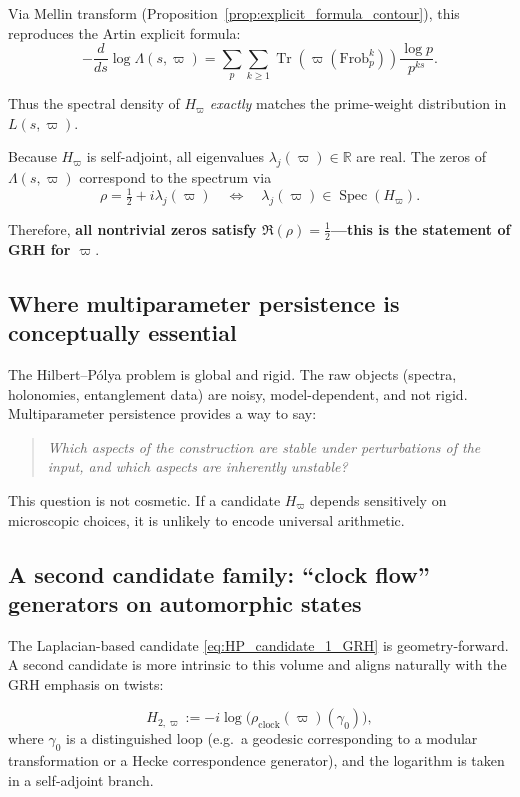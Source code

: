 \documentclass[11pt,oneside]{amsbook}
\numberwithin{equation}{section}
\theoremstyle{plain}
\theoremstyle{definition}
\theoremstyle{remark}
\DeclareMathOperator{\Spec}{\mathrm{Spec}}
\DeclareMathOperator{\Tr}{\mathrm{Tr}}
\begin{document}
Via Mellin transform (Proposition~\ref{prop:explicit_formula_contour}), this reproduces the Artin explicit formula:
\[-\frac{d}{ds}\log\Lambda(s,\varpi) = \sum_p \sum_{k \ge 1} \Tr(\varpi(\mathrm{Frob}_p^k)) \frac{\log p}{p^{ks}}.\]

Thus the spectral density of $H_\varpi$ \emph{exactly} matches the prime-weight distribution in $L(s,\varpi)$.

Because $H_\varpi$ is self-adjoint, all eigenvalues $\lambda_j(\varpi) \in \mathbb{R}$ are real. The zeros of $\Lambda(s,\varpi)$ correspond to the spectrum via
\[\rho = \tfrac{1}{2} + i\lambda_j(\varpi) \quad\Longleftrightarrow\quad \lambda_j(\varpi) \in \Spec(H_\varpi).\]

Therefore, \textbf{all nontrivial zeros satisfy $\Re(\rho) = \tfrac{1}{2}$---this is the statement of GRH for $\varpi$}.


\subsection{Where multiparameter persistence is conceptually essential}
\label{sec:why_persistence_HP}

The Hilbert--Pólya problem is global and rigid.
The raw objects (spectra, holonomies, entanglement data) are noisy, model-dependent, and not rigid.
Multiparameter persistence provides a way to say:
\begin{quote}
\emph{Which aspects of the construction are stable under perturbations of the input, and which aspects are inherently unstable?}
\end{quote}
This question is not cosmetic.
If a candidate $H_\varpi$ depends sensitively on microscopic choices, it is unlikely to encode universal arithmetic.

\subsection{A second candidate family: ``clock flow'' generators on automorphic states}
\label{sec:HP_candidate_2}

The Laplacian-based candidate \eqref{eq:HP_candidate_1_GRH} is geometry-forward.
A second candidate is more intrinsic to this volume and aligns naturally with the GRH emphasis on twists:

\begin{equation}
\label{eq:HP_candidate_2}
H_{2,\varpi}:=-i\log\bigl(\rho_{\mathrm{clock}}(\varpi)(\gamma_0)\bigr),
\end{equation}
where $\gamma_0$ is a distinguished loop (e.g.\ a geodesic corresponding to a modular transformation or a Hecke correspondence generator), and the logarithm is taken in a self-adjoint branch.
\end{document}
